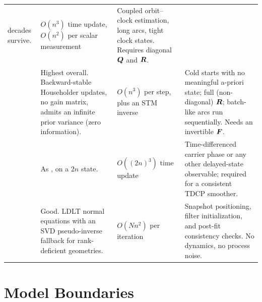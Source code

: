 \begin{table}[htbp]
\begin{tabularx}{\textwidth}{LLLL}
        decades survive.
      & $O(n^3)$ time update, $O(n^2)$ per scalar measurement
      & Coupled orbit--clock estimation, long arcs, tight clock states.
        Requires diagonal $\bm{Q}$ and $\bm{R}$. \\
    \addlinespace
      & Highest overall. Backward-stable Householder updates, no gain matrix,
        admits an infinite prior variance (zero information).
      & $O(n^3)$ per step, plus an STM inverse
      & Cold starts with no meaningful a-priori state; full (non-diagonal)
        $\bm{R}$; batch-like arcs run sequentially. Needs an invertible
        $\bm{F}$. \\
    \addlinespace
      & As , on a $2n$ state.
      & $O((2n)^3)$ time update
      & Time-differenced carrier phase or any other delayed-state observable;
        required for a consistent TDCP smoother. \\
    \addlinespace
      & Good. LDLT normal equations with an SVD pseudo-inverse fallback for
        rank-deficient geometries.
      & $O(N n^2)$ per iteration
      & Snapshot positioning, filter initialization, and post-fit consistency
        checks. No dynamics, no process noise. \\
    \bottomrule
  \end{tabularx}
\end{table}

\section{Model Boundaries}
\label{sec:flt-boundaries}

